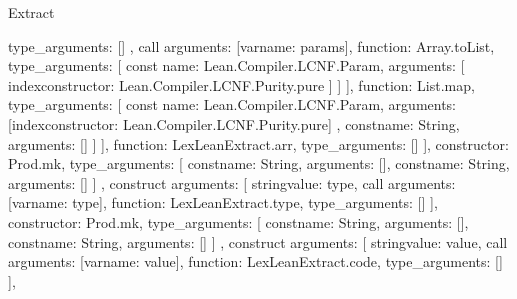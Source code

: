 \begin{lexlean}{Extract}
\begin{toolingmodule}
{{{{{{{{{{{                                    type_arguments: []
                                  }
                                },
                                call{
                                  arguments: [var{name: params}],
                                  function: Array.toList,
                                  type_arguments: [
                                    const{
                                      name: Lean.Compiler.LCNF.Param,
                                      arguments: [
                                        index{constructor: Lean.Compiler.LCNF.Purity.pure}
                                      ]
                                    }
                                  ]
                                }
                              ],
                              function: List.map,
                              type_arguments: [
                                const{
                                  name: Lean.Compiler.LCNF.Param,
                                  arguments: [index{constructor: Lean.Compiler.LCNF.Purity.pure}]
                                },
                                const{name: String, arguments: []}
                              ]
                            }
                          ],
                          function: LexLeanExtract.arr,
                          type_arguments: []
                        }
                      ],
                      constructor: Prod.mk,
                      type_arguments: [
                        const{name: String, arguments: []},
                        const{name: String, arguments: []}
                      ]
                    },
                    construct{
                      arguments: [
                        string{value: type},
                        call{
                          arguments: [var{name: type}],
                          function: LexLeanExtract.type,
                          type_arguments: []
                        }
                      ],
                      constructor: Prod.mk,
                      type_arguments: [
                        const{name: String, arguments: []},
                        const{name: String, arguments: []}
                      ]
                    },
                    construct{
                      arguments: [
                        string{value: value},
                        call{
                          arguments: [var{name: value}],
                          function: LexLeanExtract.code,
                          type_arguments: []
                        }
                      ],
}}}}}}}
\end{toolingmodule}
\end{lexlean}
